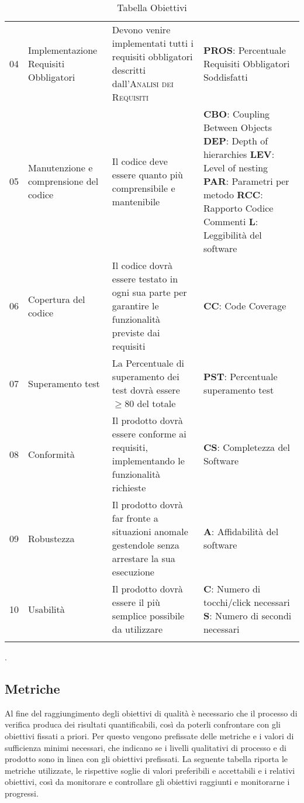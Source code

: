 \begin{longtable}{ 
		>{}p{} 
		>{}p{}
        >{}p{}
        >{\centering}p{} }
        04 & Implementazione Requisiti Obbligatori & Devono venire implementati tutti i requisiti obbligatori descritti dall'\textsc{Analisi dei Requisiti} & \textbf{PROS}: Percentuale Requisiti Obbligatori Soddisfatti \tabularnewline

        05 & Manutenzione e comprensione del codice & Il codice deve essere quanto più comprensibile e mantenibile & \textbf{CBO}: Coupling Between Objects \newline \textbf{DEP}: Depth of hierarchies \newline \textbf{LEV}: Level of nesting \newline \textbf{PAR}: Parametri per metodo \newline \textbf{RCC}: Rapporto Codice Commenti \newline \textbf{L}: Leggibilità del software \tabularnewline

        06 & Copertura del codice & Il codice dovrà essere testato in ogni sua parte per garantire le funzionalità previste dai requisiti & \textbf{CC}: Code Coverage \tabularnewline

        07 & Superamento test & La Percentuale di superamento dei test dovrà essere $\geq 80$ del totale & \textbf{PST}: Percentuale superamento test \tabularnewline

        08 & Conformità & Il prodotto dovrà essere conforme ai requisiti, implementando le funzionalità richieste & \textbf{CS}: Completezza del Software \tabularnewline

        09 & Robustezza & Il prodotto dovrà far fronte a situazioni anomale gestendole senza arrestare la sua esecuzione & \textbf{A}: Affidabilità del software \tabularnewline

        10 & Usabilità & Il prodotto dovrà essere il più semplice possibile da utilizzare & \textbf{C}: Numero di tocchi/click necessari \newline \textbf{S}: Numero di secondi necessari\tabularnewline
        \caption{Tabella Obiettivi}
    \end{longtable}.



\subsection{Metriche}
Al fine del raggiungimento degli obiettivi di qualità è necessario che il processo di verifica produca dei risultati quantificabili, così da poterli confrontare con gli obiettivi fissati a priori. Per questo vengono prefissate delle metriche e i valori di sufficienza minimi necessari, che indicano se i livelli qualitativi di processo e di prodotto sono in linea con gli obiettivi prefissati. La seguente tabella riporta le metriche utilizzate, le rispettive soglie di valori preferibili e accettabili e i relativi obiettivi, così da monitorare e controllare gli obiettivi raggiunti e monitorarne i progressi.

